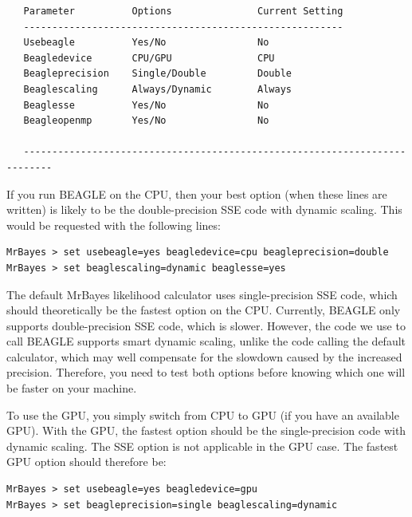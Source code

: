 \documentclass[12pt]{book}
\begin{document}
\footnotesize
\begin{singlespacing}
\begin{verbatim}
   Parameter          Options               Current Setting                      
   --------------------------------------------------------                      
   Usebeagle          Yes/No                No                                   
   Beagledevice       CPU/GPU               CPU                                   
   Beagleprecision    Single/Double         Double                                   
   Beaglescaling      Always/Dynamic        Always                                   
   Beaglesse          Yes/No                No                                   
   Beagleopenmp       Yes/No                No                                   
                                                                                 
   ---------------------------------------------------------------------------   
\end{verbatim}
\end{singlespacing}
\normalsize

If you run BEAGLE on the CPU, then your best option (when these lines are written) is likely to be
the double-precision SSE code with dynamic scaling. This would be requested with the following
lines:

\begin{verbatim}
MrBayes > set usebeagle=yes beagledevice=cpu beagleprecision=double
MrBayes > set beaglescaling=dynamic beaglesse=yes
\end{verbatim}

The default MrBayes likelihood calculator uses single-precision SSE code, which should
theoretically be the fastest option on the CPU. Currently, BEAGLE only supports double-precision
SSE code, which is slower. However, the code we use to call BEAGLE supports smart dynamic scaling,
unlike the code calling the default calculator, which may well compensate for the slowdown caused
by the increased precision. Therefore, you need to test both options before knowing which one will
be faster on your machine.

To use the GPU, you simply switch from CPU to GPU (if you have an available GPU). With the GPU, the
fastest option should be the single-precision code with dynamic scaling. The SSE option is not
applicable in the GPU case. The fastest GPU option should therefore be:

\begin{verbatim}
MrBayes > set usebeagle=yes beagledevice=gpu
MrBayes > set beagleprecision=single beaglescaling=dynamic
\end{verbatim}
\end{document}
